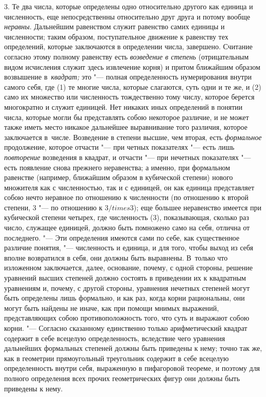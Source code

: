 3. Те два числа, которые определены одно относительно другого как единица и
численность, еще непосредственны относительно друг друга и потому вообще {\em
неравны}. Дальнейшим равенством служит равенство самих единицы и численности;
таким образом, поступательное движение к равенству тех определений, которые
заключаются в определении числа, завершено. Считание согласно этому полному
равенству есть {\em возведение в степень} (отрицательным видом исчисления
служит здесь извлечение корня) и притом ближайшим образом возвышение
в~{\em квадрат;} это "--- полная определенность нумерирования внутри самого
себя, где (1) те многие числа, которые слагаются, суть одни и те же, и (2) само
их множество или численность тождественно тому числу, которое берется
многократно и служит единицей. Нет никаких иных определений в понятии числа,
которые могли бы представлять собою некоторое различие, и не может также иметь
место никакое дальнейшее выравнивание того различия, которое заключается
в~числе. Возведение в степени высшие, чем вторая, есть {\em формальное}
продолжение, которое отчасти "--- при четных показателях "--- есть лишь
{\em повторение} возведения в квадрат, и отчасти "--- при нечетных показателях
"--- есть появление снова прежнего неравенства; а именно, при формальном
равенстве (например, ближайшим образом в кубической степени) нового множителя
как с численностью, так и с единицей, он как единица представляет собою нечто
неравное по отношению к численности (по отношению к второй степени, 3 "--- по
отношению к $3/times 3$); еще большее неравенство имеется при кубической
степени четырех, где численность (3), показывающая, сколько раз число, служащее
единицей, должно быть помножено само на себя, отлична от последнего. "--- Эти
определения имеются сами по себе, как существенное различие понятия, "---
численность и единица, и для того, чтобы выход из себя вполне возвратился в
себя, они должны быть выравнены. В~только что изложенном заключается, далее,
основание, почему, с одной стороны, решение уравнений высших степеней должно
состоять в приведении их к квадратным уравнениям и, почему, с другой стороны,
уравнения нечетных степеней могут быть определены лишь формально, и как раз,
когда корни рациональны, они могут быть найдены не иначе, как при помощи мнимых
выражений, представляющих собою противоположность того, что суть и выражают
собою корни. "--- Согласно сказанному единственно только арифметический квадрат
содержит в себе всецелую определенность, вследствие чего уравнения дальнейших
формальных степеней должны быть приведены к нему; точно так же, как в геометрии
прямоугольный треугольник содержит в себе всецелую определенность внутри себя,
выраженную в пифагоровой теореме, и поэтому для полного определения всех прочих
геометрических фигур они должны быть приведены к нему.

